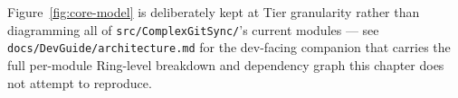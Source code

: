 
Figure~\ref{fig:core-model} is deliberately kept at Tier granularity rather
than diagramming all of \texttt{src/ComplexGitSync/}'s current modules —
see \texttt{docs/DevGuide/architecture.md} for the dev-facing companion
that carries the full per-module Ring-level breakdown and dependency
graph this chapter does not attempt to reproduce.


